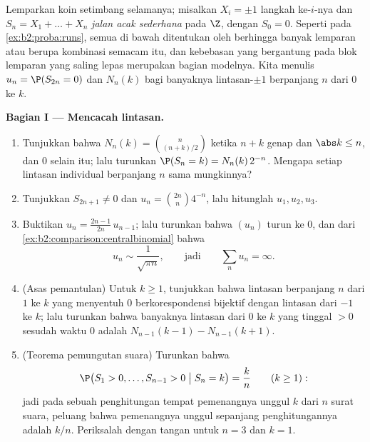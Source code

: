 \begin{problem}\label{pb:b2:proba:1}
Lemparkan koin setimbang selamanya; misalkan $X_i = \pm1$ langkah ke-$i$-nya
dan $S_n = X_1 + \dots + X_n$ \emph{jalan acak
sederhana} pada $\Z$, dengan $S_0 = 0$. Seperti pada
\cref{ex:b2:proba:runs}, semua  di bawah ditentukan oleh
berhingga banyak lemparan atau berupa kombinasi  
semacam itu, dan kebebasan  yang bergantung pada blok lemparan
yang saling lepas merupakan bagian modelnya. Kita menulis $u_n =
\P(S_{2n} = 0)$ dan $N_n(k)$ bagi banyaknya lintasan-$\pm1$
berpanjang $n$ dari $0$ ke $k$.

\medskip
\noindent\textbf{Bagian I --- Mencacah lintasan.}
\begin{enumerate}
  \item Tunjukkan bahwa $N_n(k) = \binom{n}{(n+k)/2}$ ketika $n + k$
        genap dan $\abs k \leq n$, dan $0$ selain itu; lalu turunkan
        $\P(S_n = k) = N_n(k)\,2^{-n}$. Mengapa setiap
        lintasan individual berpanjang $n$ sama mungkinnya?
  \item Tunjukkan $S_{2n+1} \neq 0$ dan $u_n =
        \binom{2n}{n}4^{-n}$, lalu hitunglah $u_1, u_2, u_3$.
  \item Buktikan $u_n = \frac{2n-1}{2n}\,u_{n-1}$; lalu turunkan bahwa
        $(u_n)$ turun ke $0$, dan dari
        \cref{ex:b2:comparison:centralbinomial} bahwa
        \[
        u_n \sim \frac{1}{\sqrt{\pi n}},
        \qquad\text{jadi}\qquad
        \sum_n u_n = \infty .
        \]
  \item (Asas pemantulan) Untuk $k \geq 1$, tunjukkan bahwa
        lintasan berpanjang $n$ dari $1$ ke $k$ yang menyentuh $0$
        berkorespondensi bijektif dengan lintasan dari $-1$ ke $k$;
        lalu turunkan bahwa banyaknya lintasan dari $0$ ke $k$ yang
        tinggal $> 0$ sesudah waktu $0$ adalah $N_{n-1}(k-1) -
        N_{n-1}(k+1)$.
  \item (Teorema pemungutan suara) Turunkan bahwa
        \[
        \P\bigl(S_1 > 0, \dots, S_{n-1} > 0 \bigm| S_n =
        k\bigr) = \frac kn \qquad (k \geq 1) :
        \]
        jadi pada sebuah penghitungan tempat pemenangnya unggul $k$ dari $n$
        surat suara, peluang bahwa pemenangnya unggul sepanjang
        penghitungannya adalah $k/n$. Periksalah dengan tangan untuk $n = 3$ dan $k =
        1$.
\end{enumerate}


\end{problem}
